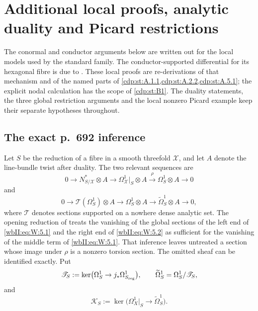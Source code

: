\section{Additional local proofs, analytic duality and Picard restrictions}
\label{wbII:sec:working-supplement}

The conormal and conductor arguments below are written out for the local
models used by the standard family. The conductor-supported differential
for its hexagonal fibre is due to \citet[Section~10.2, Lemma~10.3]{AC2026}.
These local proofs are re-derivations of that mechanism and of the named
parts of \cref{cdp:st:A.1.1,cdp:st:A.2.2,cdp:st:A.5.1}; the explicit
nodal calculation has the scope of \cref{cdp:st:B1}. The duality statements,
the three global restriction arguments and the local nonzero Picard
example keep their separate hypotheses throughout.

\subsection{The exact p.~692 inference}

Let $S$ be the reduction of a fibre in a smooth threefold $\mathcal X$,
and let $A$ denote the line-bundle twist after duality.  The two relevant
sequences are
\[
0\longrightarrow N^*_{S/\mathcal X}\otimes A
\longrightarrow\Omega^1_{\mathcal X}|_S\otimes A
\xrightarrow{\rho}\Omega^1_S\otimes A\longrightarrow0
\tag{W.1}\label{wbII:eq:W:5.1}
\]
and
\[
0\longrightarrow\mathcal T(\Omega^1_S)\otimes A
\longrightarrow\Omega^1_S\otimes A
\longrightarrow\widetilde\Omega^1_S\otimes A\longrightarrow0,
\tag{W.2}\label{wbII:eq:W:5.2}
\]
where $\mathcal T$ denotes sections supported on a nowhere dense analytic
set.  The opening reduction of \cite[\S7, p.~692]{CDP20} treats the
vanishing of the global sections of the left end of \eqref{wbII:eq:W:5.1} and the right end
of \eqref{wbII:eq:W:5.2} as sufficient for the vanishing of the middle term of \eqref{wbII:eq:W:5.1}.
That inference leaves untreated a section whose image under $\rho$ is a
nonzero torsion section.  The omitted sheaf can be identified exactly.  Put
\[
 \mathscr T_S:=\ker\bigl(\Omega_S^1\to
 j_*\Omega^1_{S_{\rm reg}}\bigr),
 \qquad \widetilde\Omega_S^1=\Omega_S^1/\mathscr T_S,
\]
and
\[
 \mathscr K_S:=
 \ker\bigl(\Omega_X^1|_S\longrightarrow\widetilde\Omega_S^1\bigr).
\]


